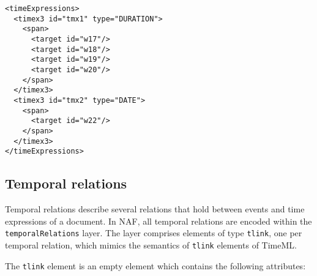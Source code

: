 \begin{Verbatim}[fontsize=\small]
<timeExpressions>
  <timex3 id="tmx1" type="DURATION">
    <span>
      <target id="w17"/>
      <target id="w18"/>
      <target id="w19"/>
      <target id="w20"/>
    </span>
  </timex3>
  <timex3 id="tmx2" type="DATE">
    <span>
      <target id="w22"/>
    </span>
  </timex3>
</timeExpressions>
\end{Verbatim}

\subsection{Temporal relations}
\label{sec:temporal-relations}

Temporal relations describe several relations that hold between events and
time expressions of a document. In NAF, all temporal relations are encoded
within the \texttt{temporalRelations} layer. The layer comprises elements of
type \texttt{tlink}, one per temporal relation, which mimics the semantics
of \texttt{tlink} elements of TimeML.

The \texttt{tlink} element is an empty element which contains the following
attributes:

